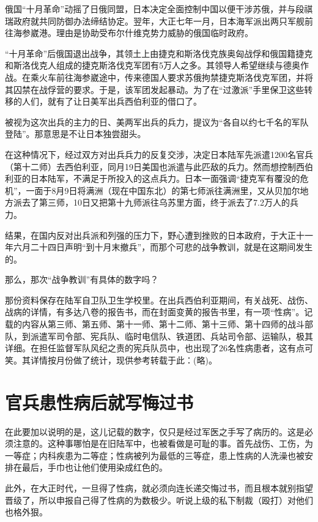 \documentclass[12pt,UTF8]{ctexbook}
\begin{document}
俄国“十月革命”动摇了日俄同盟，日本决定全面控制中国以便干涉苏俄，并与段祺瑞政府就共同防御办法缔结协定。翌年，大正七年一月，日本海军派出两只军舰前往海参崴港。理由是协助受布尔什维克势力威胁的俄国临时政府。

“十月革命”后俄国退出战争，其领土上由捷克和斯洛伐克族奥匈战俘和俄国籍捷克和斯洛伐克人组成的捷克斯洛伐克军团有5万人之多。其领导人希望继续与德奥作战。在乘火车前往海参崴途中，传来德国人要求苏俄拘禁捷克斯洛伐克军团，并将其囚禁在战俘营的要求。于是，该军团发起暴动。为了在“过激派”手里保卫这些转移的人们，就有了让日美军出兵西伯利亚的借口了。

被视为这次出兵的主力的日、美两军出兵的兵力，提议为“各自以约七千名的军队登陆”。那意思是不让日本独尝甜头。

在这种情况下，经过双方对出兵兵力的反复交涉，决定日本陆军先派遣1200名官兵（第十二师）去西伯利亚，同月19日美国也派遣与此匹敌的兵力。然而想控制西伯利亚的日本陆军，不满足于所投入的这点兵力。日本一面强调“捷克军有覆没的危机”，一面于8月9日将满洲（现在中国东北）的第七师派往满洲里，又从贝加尔地方派去了第三师，10日又把第十九师派往乌苏里方面，终于派去了7.2万人的兵力。

结果，在国内反对出兵派和列强的压力下，野心遭到挫败的日本政府，于大正十一年六月二十四日声明“到十月末撤兵”，而那个可悲的战争教训，就是在这期间发生的。

那么，那次“战争教训”有具体的数字吗？

那份资料保存在陆军自卫队卫生学校里。在出兵西伯利亚期间，有关战死、战伤、战病的详情，有多达八卷的报告书，而在封面变黄的报告书里，有一项“性病”。记载的内容从第三师、第五师、第十一师、第十二师、第十三师、第十四师的战斗部队，到派遣军司令部、宪兵队、临时电信队、铁道团、兵站司令部、运输队，极其详细。在担任监督军队风纪之责的宪兵队员中，也出现了26名性病患者，这有点可笑。其详情按月份做了统计，现供参考转载于此：(略)。

\section{官兵患性病后就写悔过书}

在此要加以说明的是，这儿记载的数字，仅只是经过军医之手写了病历的。这是必须注意的。这种事哪怕是在旧陆军中，也被看做是可耻的事。首先战伤、工伤，为一等症；内科疾患为二等症；性病被列为最低的三等症，患上性病的人洗澡也被安排在最后，手巾也让他们使用染成红色的。

此外，在大正时代，一旦得了性病，就必须向连长递交悔过书，而且根本就别指望晋级了，所以申报自己得了性病的为数极少。听说上级的私下制裁（殴打）对他们也格外狠。
\end{document}
